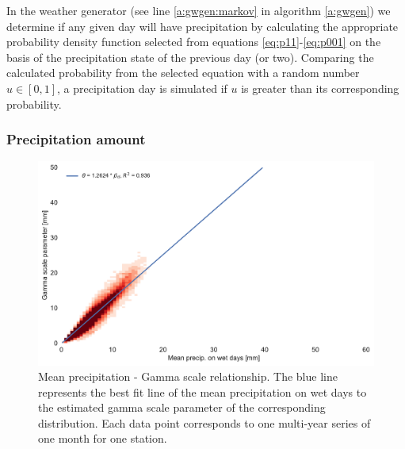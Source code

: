 \begin{refsection}
In the weather generator (see line \ref{a:gwgen:markov} in algorithm \ref{a:gwgen}) we determine if any given day will have precipitation by calculating the appropriate probability density function selected from  equations \eqref{eq:p11}-\eqref{eq:p001} on the basis of the precipitation state of the previous day (or two). Comparing the calculated probability from the selected equation with a random number $u\in[0, 1]$, a precipitation day is simulated if $u$ is greater than its corresponding probability.

\subsubsection{Precipitation amount} \label{sec:dist_params}

\begin{figure}
	\includegraphics[width=\linewidth]{gwgen-figures/f04.pdf}
	\caption[Mean precipitation - Gamma scale relationship]{Mean precipitation - Gamma scale relationship. The blue line represents the best fit line of the mean precipitation on wet days to the estimated gamma scale parameter of the corresponding distribution. Each data point corresponds to one multi-year series of one month for one station.}
	\label{fig:gscale_meanw}
\end{figure}


\end{refsection}
